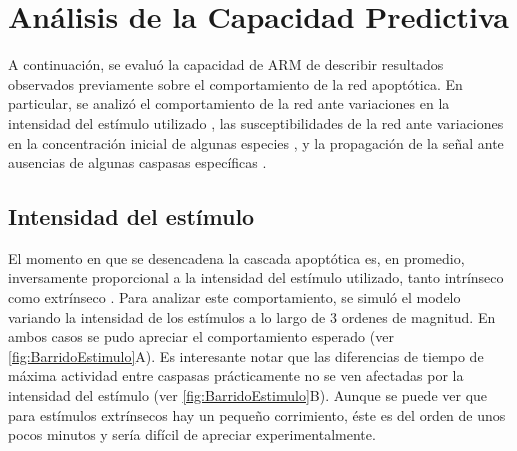 \section{Análisis de la Capacidad Predictiva}


A continuación, se evaluó la capacidad de ARM de describir resultados observados previamente sobre el comportamiento de la red apoptótica. En particular, se analizó el comportamiento de la red ante variaciones en la intensidad del estímulo utilizado \citep{Zhang2009, Albeck2008}, las susceptibilidades de la red ante variaciones en la concentración inicial de algunas especies \citep{Gaudet2012, Spencer2009, Rehm2006}, y la propagación de la señal ante ausencias de algunas caspasas específicas \citep{McComb2019, Inoue2009}.


\subsection{Intensidad del estímulo}


El momento en que se desencadena la cascada apoptótica es, en promedio, inversamente proporcional a la intensidad del estímulo utilizado, tanto intrínseco como extrínseco \citep{Zhang2009, Albeck2008}. Para analizar este comportamiento, se simuló el modelo variando la intensidad de los estímulos a lo largo de 3 ordenes de magnitud. En ambos casos se pudo apreciar el comportamiento esperado (ver \cref{fig:BarridoEstimulo}A). Es interesante notar que las diferencias de tiempo de máxima actividad entre caspasas prácticamente no se ven afectadas por la intensidad del estímulo (ver \cref{fig:BarridoEstimulo}B). Aunque se puede ver que para estímulos extrínsecos hay un pequeño corrimiento, éste es del orden de unos pocos minutos y sería difícil de apreciar experimentalmente.


